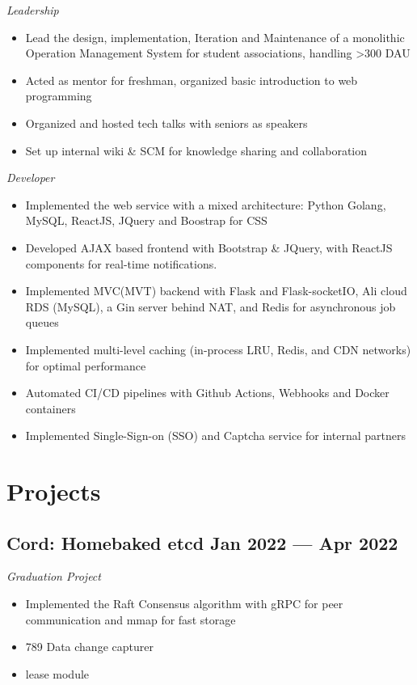 \documentclass[a4,12pt]{article}
\newcommand{\subtext}[1]{
#1\par\vspace{-0.3cm}}
\newenvironment{zitemize}{
\begin{itemize}\itemsep0pt \parskip0pt \parsep1pt}
{\end{itemize}\vspace{-0.5cm}}
\begin{document}
\subtext{\textit{Leadership}}
\begin{zitemize}
    \item Lead the design, implementation, Iteration and Maintenance of a monolithic Operation Management System for student associations, handling >300 DAU
    \item Acted as mentor for freshman, organized basic introduction to web programming
    \item Organized and hosted tech talks with seniors as speakers
    \item Set up internal wiki \& SCM for knowledge sharing and collaboration
\end{zitemize}

\subtext{\textit{Developer}}
    \begin{zitemize}
        \item Implemented the web service with a mixed architecture: Python Golang, MySQL, ReactJS, JQuery and Boostrap for CSS
        \item Developed AJAX based frontend with Bootstrap \& JQuery, with ReactJS components for real-time notifications.
        \item Implemented MVC(MVT) backend with Flask and Flask-socketIO, Ali cloud RDS (MySQL), a Gin server behind NAT, and Redis for asynchronous job queues
        \item Implemented multi-level caching (in-process LRU, Redis, and CDN networks) for optimal performance
        \item Automated CI/CD pipelines with Github Actions, Webhooks and Docker containers
        \item Implemented Single-Sign-on (SSO) and Captcha service for internal partners 
    \end{zitemize}

\section{\textbf{Projects}}

\subsection*{Cord: {\normalsize\normalfont Homebaked etcd} \hfill \textbf{Jan 2022 --- Apr 2022}} 
\textit{Graduation Project}
\begin{zitemize}
    \item Implemented the Raft Consensus algorithm with gRPC for peer communication and mmap for fast storage
    \item 789 Data change capturer
    \item lease module
\end{zitemize}
\end{document}
